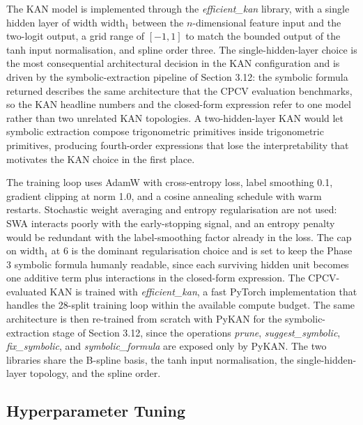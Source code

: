 \documentclass[12pt,a4paper,oneside]{article}
\begin{document}
The KAN model \citep{liu_kan_2024} is implemented through the \textit{efficient\_kan} library, with a single hidden layer of width $\text{width}_1$ between the $n$-dimensional feature input and the two-logit output, a grid range of $[-1, 1]$ to match the bounded output of the tanh input normalisation, and spline order three. The single-hidden-layer choice is the most consequential architectural decision in the KAN configuration and is driven by the symbolic-extraction pipeline of Section 3.12: the symbolic formula returned describes the same architecture that the CPCV evaluation benchmarks, so the KAN headline numbers and the closed-form expression refer to one model rather than two unrelated KAN topologies. A two-hidden-layer KAN would let symbolic extraction compose trigonometric primitives inside trigonometric primitives, producing fourth-order expressions that lose the interpretability that motivates the KAN choice in the first place.

The training loop uses AdamW with cross-entropy loss, label smoothing 0.1, gradient clipping at norm 1.0, and a cosine annealing schedule with warm restarts. Stochastic weight averaging and entropy regularisation are not used: SWA interacts poorly with the early-stopping signal, and an entropy penalty would be redundant with the label-smoothing factor already in the loss. The cap on $\text{width}_1$ at 6 is the dominant regularisation choice and is set to keep the Phase 3 symbolic formula humanly readable, since each surviving hidden unit becomes one additive term plus interactions in the closed-form expression. The CPCV-evaluated KAN is trained with \textit{efficient\_kan}, a fast PyTorch implementation that handles the 28-split training loop within the available compute budget. The same architecture is then re-trained from scratch with PyKAN for the symbolic-extraction stage of Section 3.12, since the operations \textit{prune}, \textit{suggest\_symbolic}, \textit{fix\_symbolic}, and \textit{symbolic\_formula} are exposed only by PyKAN. The two libraries share the B-spline basis, the tanh input normalisation, the single-hidden-layer topology, and the spline order.


\subsection{Hyperparameter Tuning}\label{subsec:tuning}
\end{document}
